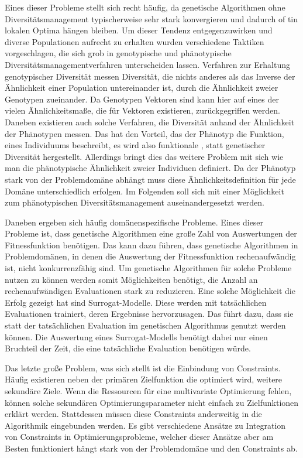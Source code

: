 Eines dieser Probleme stellt sich recht häufig, da genetische Algorithmen ohne Diversitätsmanagement typischerweise sehr stark konvergieren und dadurch of tin lokalen Optima hängen bleiben.
Um dieser Tendenz entgegenzuwirken und diverse Populationen aufrecht zu erhalten wurden verschiedene Taktiken vorgeschlagen, die sich grob in genotypische und phänotypische Diversitätsmanagementverfahren unterscheiden lassen.
Verfahren zur Erhaltung genotypischer Diversität messen Diversität, die nichts anderes als das Inverse der Ähnlichkeit einer Population untereinander ist, durch die Ähnlichkeit zweier Genotypen zueinander.
Da Genotypen Vektoren sind kann hier auf eines der vielen Ähnlichkeitsmaße, die für Vektoren existieren, zurückgegriffen werden.
Daneben existieren auch solche Verfahren, die Diversität anhand der Ähnlichkeit der Phänotypen messen.
Das hat den Vorteil, das der Phänotyp die Funktion, eines Individuums beschreibt, es wird also funktionale , statt genetischer Diversität hergestellt.
Allerdings bringt dies das weitere Problem mit sich wie man die phänotypische Ähnlichkeit zweier Individuen definiert.
Da der Phänotyp stark von der Problemdomäne abhängt muss diese Ähnlichkeitsdefinition für jede Domäne unterschiedlich erfolgen.
Im Folgenden soll sich mit einer Möglichkeit zum phänotypischen Diversitätsmanagement auseinandergesetzt werden.

Daneben ergeben sich häufig domänenspezifische Probleme.
Eines dieser Probleme ist, dass genetische Algorithmen eine große Zahl von Auswertungen der Fitnessfunktion benötigen.
Das kann dazu führen, dass genetische Algorithmen in Problemdomänen, in denen die Auswertung der Fitnessfunktion rechenaufwändig ist, nicht konkurrenzfähig sind.
Um genetische Algorithmen für solche Probleme nutzen zu können werden somit Möglichkeiten benötigt, die Anzahl an rechenaufwändigen Evaluationen stark zu reduzieren.
Eine solche Möglichkeit die Erfolg gezeigt hat sind Surrogat-Modelle.
Diese werden mit tatsächlichen Evaluationen trainiert, deren Ergebnisse hervorzusagen.
Das führt dazu, dass sie statt der tatsächlichen Evaluation im genetischen Algorithmus genutzt werden können.
Die Auswertung eines Surrogat-Modells benötigt dabei nur einen Bruchteil der Zeit, die eine tatsächliche Evaluation benötigen würde.

Das letzte große Problem, was sich stellt ist die Einbindung von Constraints.
Häufig existieren neben der primären Zielfunktion die optimiert wird, weitere sekundäre Ziele.
Wenn die Ressourcen für eine multivariate Optimierung fehlen, können solche sekundären Optimierungsparameter nicht einfach zu Zielfunktionen erklärt werden.
Stattdessen müssen diese Constraints anderweitig in die Algorithmik eingebunden werden.
Es gibt verschiedene Ansätze zu Integration von Constraints in Optimierungsprobleme, welcher dieser Ansätze aber am Besten funktioniert hängt stark von der Problemdomäne und den Constraints ab.

